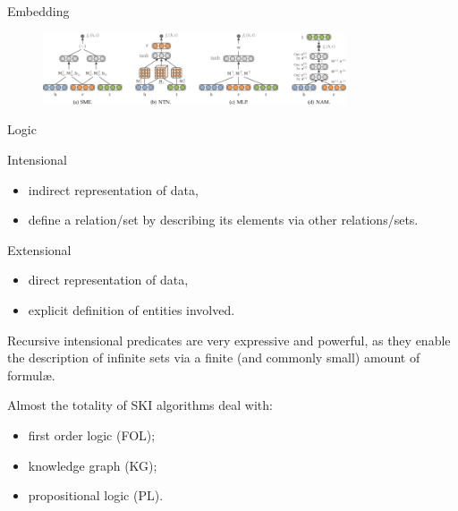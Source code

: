 \documentclass[presentation]{beamer}\mode<presentation>{\usetheme{AMSBolognaFC}}
\begin{document}
\begin{frame}[allowframebreaks]{Embedding}
    \begin{figure}
        \centering
        \includegraphics[width=0.8\textwidth]{figures/kge-nn-2.png}
    \end{figure}
    
\end{frame}

\begin{frame}[allowframebreaks]{Logic}
    \begin{block}{Intensional}
        \begin{itemize}
            \item indirect representation of data,
            \item define a relation/set by describing its elements via other relations/sets.
        \end{itemize}
    \end{block}
    \begin{block}{Extensional}
        \begin{itemize}
            \item direct representation of data,
            \item explicit definition of entities involved.
        \end{itemize}
    \end{block}
    
    Recursive intensional predicates are very expressive and powerful, as they enable the description of infinite sets via a finite (and commonly small) amount of formul\ae.
    
    \framebreak        
    
    Almost the totality of SKI algorithms deal with:
    \begin{itemize}
        \item \alert{first order logic} (FOL);
        \item \alert{knowledge graph} (KG);
        \item \alert{propositional logic} (PL).
        
    \end{itemize}
\end{frame}
\end{document}
